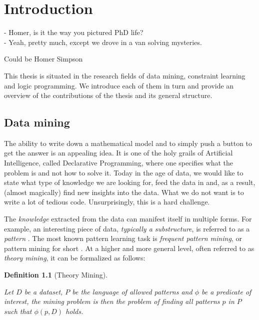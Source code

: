 \chapter{Introduction}\label{ch:introduction}
\epigraph{
- Homer, is it the way you pictured PhD life?\\
- Yeah, pretty much, except we drove in a van solving mysteries.
}{Could be Homer Simpson}

\begin{addmargin}[5em]{5em}
This thesis is situated in the research fields of data mining, constraint learning
and logic programming. We introduce each of them in turn and provide an overview of the
contributions of the thesis and
its general structure.
\end{addmargin}

\section{Data mining}\label{sec:data_mining}
The ability to write down a mathematical model and to simply push a button to get the
answer is an appealing idea. It is one of the holy grails of
Artificial Intelligence, called Declarative Programming, where one
specifies what the problem is and not how to solve it. Today in the age of data, we would like
to state what type of knowledge we are looking for, feed the data in and, as a result,
(almost magically) find new insights into the data. What we do not want is to write
a lot of tedious code. Unsurprisingly, this is a hard challenge. 


The \textit{knowledge} extracted from the data can manifest itself in
multiple forms. For example, an interesting piece of data,
\textit{typically a substructure}, is referred to as a \textit{pattern} \parencite{han_book}. 
The most known pattern learning task is 
\textit{frequent pattern mining}, or pattern mining for short
\parencite{survey_han}.
At a higher and more general level, often referred to as \textit{theory
mining}, it can be formalized as follows: \\

\newtheorem*{definition*}{Definition}

\begin{definition*}[Theory Mining]
\begin{mdframed}
Let $D$ be a dataset, $P$ be the language of allowed patterns and
$\phi$ be a predicate of
interest, the mining problem is then the problem of finding
all patterns $p$ in $P$ such that $\phi(p,D)$ holds.
\end{mdframed}
\end{definition*}


